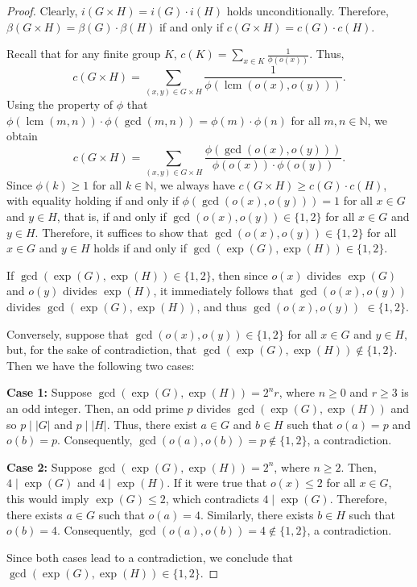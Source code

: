 \documentclass[10pt,a4paper]{amsart}
\begin{document}
\begin{proof}
    Clearly, $i(G\times H) = i(G)\cdot i(H)$ holds unconditionally. Therefore, $\beta(G\times H)=\beta(G)\cdot\beta(H)$ if and only if $c(G\times H)=c(G)\cdot c(H)$. 
    
    Recall that for any finite group $K$, $c(K) = \sum_{x \in K} \frac{1}{\phi(o(x))}$. Thus, 
    $$c(G\times H) = \sum_{(x,y)\in G\times H} \frac{1}{\phi(\operatorname{lcm}(o(x),o(y)))}.$$
    Using the property of $\phi$ that $\phi(\operatorname{lcm}(m,n))\cdot \phi(\operatorname{gcd}(m,n)) =\phi(m)\cdot\phi(n)$ for all $m,n \in \mathbb{N}$, we obtain
    $$c(G\times H) = \sum_{(x,y)\in G\times H} \frac{\phi(\operatorname{gcd}(o(x),o(y)))}{\phi(o(x))\cdot\phi(o(y))}.$$
    Since $\phi(k) \ge 1$ for all $k \in \mathbb{N}$, we always have $c(G\times H) \ge c(G)\cdot c(H)$, with equality holding if and only if $\phi(\operatorname{gcd}(o(x),o(y))) = 1$ for all $x \in G$ and $y \in H$, that is, if and only if $ \operatorname{gcd}(o(x),o(y)) \in \{1,2\}$ for all $x \in G$ and $y \in H$. Therefore, it suffices to show that $ \operatorname{gcd}(o(x),o(y)) \in \{1,2\}$ for all $x \in G$ and $y \in H$ holds if and only if $\operatorname{gcd}(\operatorname{exp}(G),\operatorname{exp}(H)) \in \{1,2\}$. 
    
    If $\operatorname{gcd}(\operatorname{exp}(G),\operatorname{exp}(H)) \in \{1,2\}$, then since $o(x)$ divides $\operatorname{exp}(G)$ and $o(y)$ divides $\operatorname{exp}(H)$, it immediately follows that $\operatorname{gcd}(o(x),o(y))$ divides $\operatorname{gcd}(\operatorname{exp}(G),\operatorname{exp}(H))$, and thus $\operatorname{gcd}(o(x),o(y))$ $\in \{1,2\}$.
    
    Conversely, suppose that $\operatorname{gcd}(o(x), o(y)) \in \{1, 2\}$ for all $x \in G$ and $y \in H$, but, for the sake of contradiction, that $\operatorname{gcd}(\operatorname{exp}(G), \operatorname{exp}(H)) \notin \{1, 2\}$. Then we have the following two cases:
    
    \textbf{Case 1:} Suppose $\operatorname{gcd}(\operatorname{exp}(G), \operatorname{exp}(H)) = 2^n r$, where $n \geq 0$ and $r \geq 3$ is an odd integer.
Then, an odd prime $p$ divides $\operatorname{gcd}(\operatorname{exp}(G), \operatorname{exp}(H))$ and so $p \mid |G|$ and $p \mid |H|$. Thus, there exist $a \in G$ and $b \in H$ such that $o(a) = p$ and $o(b) = p$. Consequently, $\operatorname{gcd}(o(a), o(b)) = p \notin \{1, 2\}$, a contradiction.

    
  \textbf{Case 2:} Suppose $\operatorname{gcd}(\operatorname{exp}(G), \operatorname{exp}(H)) = 2^n$, where $n \geq 2$. Then, $4 \mid \operatorname{exp}(G)$ and $4 \mid \operatorname{exp}(H)$. 
If it were true that $o(x) \leq 2$ for all $x \in G$, this would imply $\operatorname{exp}(G) \leq 2$, which contradicts $4 \mid \operatorname{exp}(G)$. Therefore, there exists $a \in G$ such that $o(a)=4$. Similarly, there exists $b \in H$ such that $o(b)=4$.
Consequently, $\operatorname{gcd}(o(a), o(b)) = 4 \notin \{1, 2\}$, a contradiction.

    
    Since both cases lead to a contradiction, we conclude that $\operatorname{gcd}(\operatorname{exp}(G), \operatorname{exp}(H)) \in \{1, 2\}$.
\end{proof}
\end{document}
